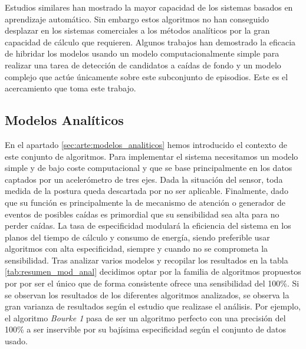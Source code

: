 Estudios similares han mostrado la mayor capacidad de los sistemas basados en aprendizaje automático. Sin embargo estos algoritmos no han conseguido desplazar en los sistemas comerciales a los métodos analíticos por la gran capacidad de cálculo que requieren. Algunos trabajos han demostrado la eficacia de hibridar los modelos usando un modelo computacionalmente simple para realizar una tarea de detección de candidatos a caídas de fondo y un modelo complejo que actúe únicamente sobre este subconjunto de episodios. Este es el acercamiento que toma este trabajo.

\subsection{Modelos Analíticos}

En el apartado \ref{sec:arte:modelos_analiticos} hemos introducido el contexto de este conjunto de algoritmos. Para implementar el sistema necesitamos un modelo simple y de bajo coste computacional y que se base principalmente en los datos captados por un acelerómetro de tres ejes. Dada la situación del sensor, toda medida de la postura queda descartada por no ser aplicable. Finalmente, dado que su función es principalmente la de mecanismo de atención o generador de eventos de posibles caídas es primordial que su sensibilidad sea alta para no perder caídas. La tasa de especificidad modulará la eficiencia del sistema en los planos del tiempo de cálculo y consumo de energía, siendo preferible usar algoritmos con alta especificidad, siempre y cuando no se comprometa la sensibilidad. Tras analizar varios modelos y recopilar los resultados en la tabla \ref{tab:resumen_mod_anal} decidimos optar por la familia de algoritmos propuestos por \cite{Bourke2006} por ser el único que de forma consistente ofrece una sensibilidad del 100\%. Si se observan los resultados de los diferentes algoritmos analizados, se observa la gran varianza de resultados según el estudio que realizase el análisis. Por ejemplo, el algoritmo \textit{Bourke 1} pasa de ser un algoritmo perfecto con una precisión del 100\% a ser inservible por su bajísima especificidad según el conjunto de datos usado. 

